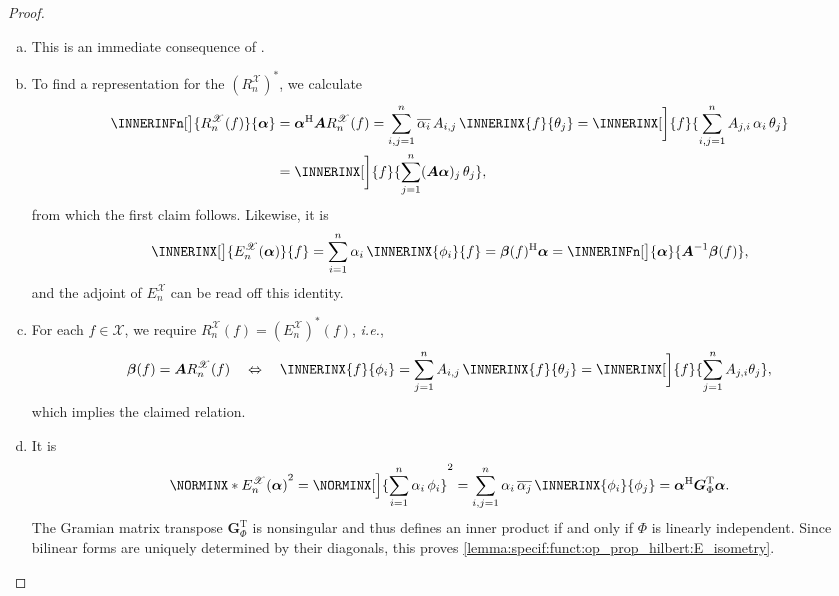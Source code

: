 \documentclass[a4paper]{paper}
\newcommand*{\SPC}[1]{{\ensuremath{\mathscr{#1}}}}
\newcommand*{\SPCX}{\SPC{X}}
\newcommand*{\EXT}[2]{\ensuremath{E_{#1}^{#2}}}
\newcommand*{\REST}[2]{\ensuremath{R_{#1}^{#2}}}
\newcommand*{\RnX}{{\ensuremath{\REST{n}{\SPC{X}}}}}
\newcommand*{\EnX}{{\ensuremath{\EXT{n}{\SPC{X}}}}}
\newcommand*{\CCONJ}[1]{{\ensuremath{\overline{#1}}}}
\newcommand*{\TRANSP}[1]{{\ensuremath{#1^{\mathrm{T}}}}}
\newcommand*{\HERM}[1]{{\ensuremath{#1^{\mathrm{H}}}}}
\newcommand*{\ie}{\textsl{i.e.}\xspace}
\newcommand*{\BDalpha}{\boldsymbol{\alpha}}
\newcommand*{\BDbeta}{\boldsymbol{\beta}}
\newcommand*{\BDA}{\boldsymbol{A}}
\newcommand*{\BDG}{\boldsymbol{G}}
\begin{document}
\begin{proof}~
 \begin{enumerate}[(a)]
  \item This is an immediate consequence of .
 
  \item To find a representation for the $(\RnX)^*$, we calculate
  \begin{align*}
   \INNERINFn[\big]{\RnX(f)}{\BDalpha} 
   &= \HERM{\BDalpha} \BDA \RnX(f)
   = \sum_{i,j=1}^n \CCONJ{\alpha_i}\, A_{i,j}\, \INNERINX{f}{\theta_j} 
   = \INNERINX[\bigg]{f}{\sum_{i,j=1}^n A_{j,i}\, \alpha_i\, \theta_j} \\
   &= \INNERINX[\bigg]{f}{\sum_{j=1}^n (\BDA \BDalpha)_j\, \theta_j},
  \end{align*}
  from which the first claim follows. Likewise, it is
  \begin{equation*}
   \INNERINX[\big]{\EnX(\BDalpha)}{f}
   = \sum_{i=1}^n \alpha_i\, \INNERINX{\phi_i}{f}
   = \HERM{\BDbeta(f)} \BDalpha
   = \INNERINFn[\big]{\BDalpha}{\BDA^{-1} \BDbeta(f)},
  \end{equation*}
  and the adjoint of $\EnX$ can be read off this identity.

  \item For each $f \in \SPCX$, we require $\RnX(f) = (\EnX)^*(f)$, \ie,
  \begin{equation*}
   \BDbeta(f) = \BDA \RnX(f) 
   \quad \Leftrightarrow \quad
   \INNERINX{f}{\phi_i} = \sum_{j=1}^n A_{i,j}\, \INNERINX{f}{\theta_j}
   = \INNERINX[\bigg]{f}{\sum_{j=1}^n A_{j,i} \theta_j},
  \end{equation*}
  which implies the claimed relation.
  
  \item It is
  \begin{equation*}
   \NORMINX*{\EnX(\BDalpha)}^2 = \NORMINX[\Big]{\sum_{i=1}^n \alpha_i\, \phi_i}^2 = 
   \sum_{i,j=1}^n \alpha_i\, \CCONJ{\alpha_j}\, \INNERINX{\phi_i}{\phi_j} 
   = \HERM{\BDalpha} \TRANSP{\BDG_\Phi} \BDalpha.
  \end{equation*}
  The Gramian matrix transpose $\TRANSP{\BDG_\Phi}$ is nonsingular and thus defines an inner product if and only if 
  $\Phi$ is linearly independent. Since bilinear forms are uniquely determined by their diagonals, this proves 
  \eqref{lemma:specif:funct:op_prop_hilbert:E_isometry}.
  

\end{enumerate}
\end{proof}
\end{document}
